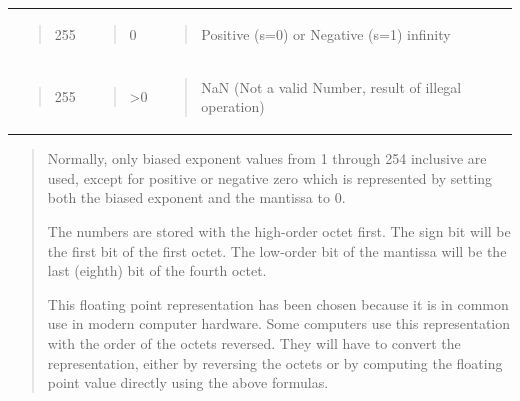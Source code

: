 \begin{longtable}[]{@{}lll@{}}
\begin{minipage}[t]{0.30\columnwidth}\raggedright
\begin{quote}
255
\end{quote}\strut
\end{minipage} & \begin{minipage}[t]{0.30\columnwidth}\raggedright
\begin{quote}
0
\end{quote}\strut
\end{minipage} & \begin{minipage}[t]{0.30\columnwidth}\raggedright
\begin{quote}
Positive (s=0) or Negative (s=1) infinity
\end{quote}\strut
\end{minipage}\tabularnewline
\begin{minipage}[t]{0.30\columnwidth}\raggedright
\begin{quote}
255
\end{quote}\strut
\end{minipage} & \begin{minipage}[t]{0.30\columnwidth}\raggedright
\begin{quote}
\textgreater0
\end{quote}\strut
\end{minipage} & \begin{minipage}[t]{0.30\columnwidth}\raggedright
\begin{quote}
NaN (Not a valid Number, result of illegal operation)
\end{quote}\strut
\end{minipage}\tabularnewline
\bottomrule
\end{longtable}

\begin{quote}
Normally, only biased exponent values from 1 through 254 inclusive are used, except for positive or negative zero which is represented by setting both the biased exponent and the mantissa to 0.

The numbers are stored with the high-order octet first. The sign bit will be the first bit of the first octet. The low-order bit of the mantissa will be the last (eighth) bit of the fourth octet.

This floating point representation has been chosen because it is in common use in modern computer hardware. Some computers use this representation with the order of the octets reversed. They will have to convert the representation, either by reversing the octets or by computing the floating point value directly using the above formulas.
\end{quote}

